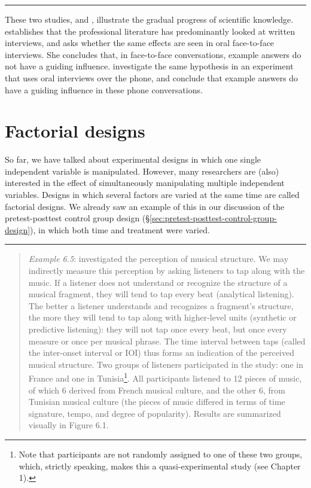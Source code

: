 \documentclass[
]{book}
\begin{document}
\begin{center}\rule{0.5\linewidth}{0.5pt}\end{center}

These two studies, \citet{Houtk91} and \citet{Wijff92}, illustrate the gradual progress of scientific knowledge. \citet{Houtk91} establishes that the professional literature has predominantly looked at written interviews, and asks whether the same effects are seen in oral face-to-face interviews. She concludes that, in face-to-face conversations, example answers do not have a guiding influence. \citet{Wijff92} investigate the same hypothesis in an experiment that uses oral interviews over the phone, and conclude that example answers do have a guiding influence in these phone conversations.

\hypertarget{sec:factorial-designs}{%
\section{Factorial designs}\label{sec:factorial-designs}}

So far, we have talked about experimental designs in which one single independent variable is manipulated. However, many researchers are (also) interested in the effect of simultaneously manipulating multiple independent variables. Designs in which several factors are varied at the same time are called factorial designs. We already saw an example of this in our discussion of the pretest-posttest control group design (§\ref{sec:pretest-posttest-control-group-design}), in which both time and treatment were varied.

\begin{center}\rule{0.5\linewidth}{0.5pt}\end{center}

\begin{quote}
\emph{Example 6.5}: \citet{Drake03} investigated the perception of musical structure. We may indirectly measure this perception by asking listeners to tap along with the music. If a listener does not understand or recognize the structure of a musical fragment, they will tend to tap every beat (analytical listening). The better a listener understands and recognizes a fragment's structure, the more they will tend to tap along with higher-level units (synthetic or predictive listening): they will not tap once every beat, but once every measure or once per musical phrase. The time interval between taps (called the inter-onset interval or IOI) thus forms an indication of the perceived musical structure. Two groups of listeners participated in the study: one in France and one in Tunisia\footnote{Note that participants are not randomly assigned to one of these two groups, which, strictly speaking, makes this a quasi-experimental study (see Chapter 1).}. All participants listened to 12 pieces of music, of which 6 derived from French musical culture, and the other 6, from Tunisian musical culture (the pieces of music differed in terms of time signature, tempo, and degree of popularity). Results are summarized visually in Figure 6.1.
\end{quote}
\end{document}
